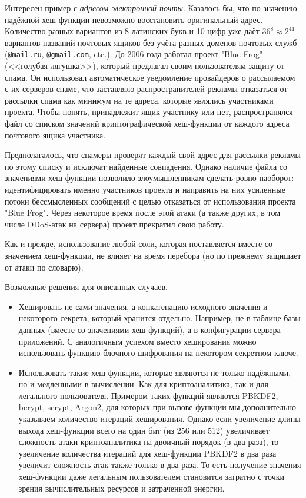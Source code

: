 Интересен пример с \emph{адресом электронной почты}. Казалось бы, что по значению надёжной хеш-функции невозможно восстановить оригинальный адрес. Количество разных вариантов из 8 латинских букв и 10 цифр уже даёт $36^8 \approx 2^{41}$ вариантов названий почтовых ящиков без учёта разных доменов почтовых служб (\texttt{@mail.ru}, \texttt{@gmail.com}, etc.). До 2006 года работал проект "Blue Frog" (<<голубая лягушка>>), который предлагал своим пользователям защиту от спама. Он использовал автоматическое уведомление провайдеров о рассылаемом с их серверов спаме, что заставляло распространителей рекламы отказаться от рассылки спама как минимум на те адреса, которые являлись участниками проекта. Чтобы понять, принадлежит ящик участнику или нет, распространялся файл со списком значений криптографической хеш-функции от каждого адреса почтового ящика участника.

Предполагалось, что спамеры проверят каждый свой адрес для рассылки рекламы по этому списку и исключат найденные совпадения. Однако наличие файла со значениями хеш-функции позволило злоумышленникам сделать ровно наоборот: идентифицировать именно участников проекта и направить на них усиленные потоки бессмысленных сообщений с целью отказаться от использования проекта "Blue Frog". Через некоторое время после этой атаки (а также других, в том числе DDoS-атак на сервера) проект прекратил свою работу.

Как и прежде, использование любой соли, которая поставляется вместе со значением хеш-функции, не влияет на время перебора (но по прежнему защищает от атаки по словарю).

Возможные решения для описанных случаев.

\begin{itemize}
    \item Хешировать не сами значения, а конкатенацию исходного значения и некоторого секрета, который хранится отдельно. Например, не в таблице базы данных (вместе со значениями хеш-функций), а в конфигурации сервера приложений. С аналогичным успехом вместо хеширования можно использовать функцию блочного шифрования на некотором секретном ключе.
    \item Использовать такие хеш-функции, которые являются не только надёжными, но и медленными в вычислении. Как для криптоаналитика, так и для легального пользователя. Примером таких функций являются PBKDF2, bcrypt, scrypt, Argon2, для которых при вызове функции мы дополнительно указываем количество итераций хеширования. Однако если увеличение длины выхода хеш-функции всего на один бит (из 256 или 512) увеличивает сложность атаки криптоаналитика на двоичный порядок (в два раза), то увеличение количества итераций для хеш-функции PBKDF2 в два раза увеличит сложность атак также только в два раза. То есть получение значения хеш-функции даже легальным пользователем становится затратно с точки зрения вычислительных ресурсов и затраченной энергии.
\end{itemize}

